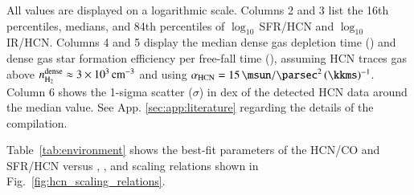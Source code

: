 \documentclass[letter, longauth]{aa} %
\begin{document}
\begin{appendix}
\begin{table}
    All values are displayed on a logarithmic scale.
    Columns 2 and 3 list the 16th percentiles, medians, and 84th percentiles of $\log_{10}\,$SFR/HCN and $\log_{10}\,$IR/HCN. 
    Columns 4 and 5 display the median dense gas depletion time (\taudense) and dense gas star formation efficiency per free-fall time (\effdense), assuming HCN traces gas above $n_\mathrm{\text{H}_2}^\mathrm{dense} \approx \SI{3e3}{\per\cubic\centi\metre}$ and using $\alphahcn=\SI{15}{\msun\per\square\parsec}\,(\SI{}{\kkms})^{-1}$. 
    Column 6 shows the 1-sigma scatter ($\sigma$) in dex of the detected HCN data around the median value.
    See App. \ref{sec:app:literature} regarding the details of the compilation.
\end{table}


Table~\ref{tab:environment} shows the best-fit parameters of the HCN/CO and SFR/HCN versus \sigstar, \sigmol, and \pde scaling relations shown in Fig.~\ref{fig:hcn_scaling_relations}.


\end{appendix}
\end{document}
